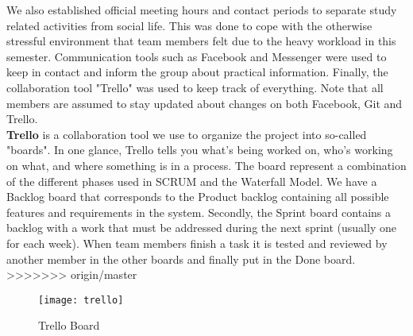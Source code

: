 We also established official meeting hours and contact periods to separate study related activities from social life. This was done to cope with the otherwise stressful environment that team members felt due to the heavy workload in this semester. Communication tools such as Facebook and Messenger were used to keep in contact and inform the group about practical information. Finally, the collaboration tool "Trello"  was used to keep track of everything. Note that all members are assumed to stay updated about changes on both Facebook, Git and Trello. 
\\
\textbf{Trello} is a collaboration tool we use to organize the project into so-called "boards". In one glance, Trello tells you what's being worked on, who's working on what, and where something is in a process. The board represent a combination of the different phases used in SCRUM and the Waterfall Model. We have a Backlog board that corresponds to the Product backlog containing all possible features and requirements in the system. Secondly, the Sprint board contains a backlog with a work that must be addressed during the next sprint (usually one for each week). When team members finish a task it is tested and reviewed by another member in the other boards and finally put in the Done board. 
>>>>>>> origin/master

\begin{figure}[H]
	\texttt{[image: trello]}
	\caption{Trello Board}
	\label{fig:trello}
\end{figure}
